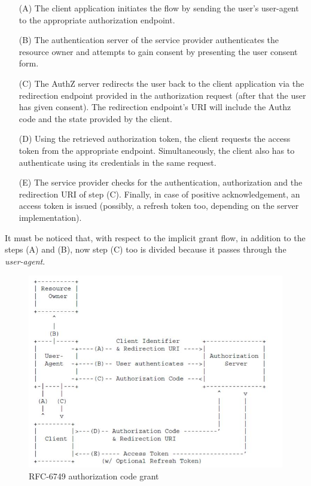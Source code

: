 \begin{itemize}
    \item[(A)]The client application initiates the flow by sending the user's user-agent to the appropriate authorization endpoint.
    \item[(B)]The authentication server of the service provider authenticates the resource owner and attempts to gain consent by presenting the user consent form.
    \item[(C)] The AuthZ server redirects the user back to the client application via the redirection endpoint provided in the authorization request (after that the user has given consent). The redirection endpoint's URI will include the Authz code and the state provided by the client.
    \item[(D)]Using the retrieved authorization token, the client requests the access token from the appropriate endpoint. Simultaneously, the client also has to authenticate using its credentials in the same request.
    \item[(E)] The service provider checks for the authentication, authorization and the redirection URI of step (C). Finally, in case of positive acknowledgement, an access token is issued (possibly, a refresh token too, depending on the server implementation).
\end{itemize}

It must be noticed that, with respect to the implicit grant flow, in addition to the steps (A) and (B), now step (C) too is divided because it passes through the \textit{user-agent}.



\vspace{0.5cm}

\begin{figure}[h!]
    \centering
    \includegraphics[scale=0.7]{chapters/images/chp2/server.jpg}
    \caption{RFC-6749 authorization code grant}
    \label{fig:serverflow}
\end{figure}

